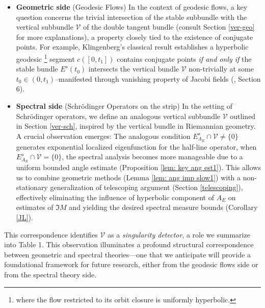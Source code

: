 \documentclass[11pt]{amsart}
\theoremstyle{remark}
\theoremstyle{definition}
\begin{document}
\begin{itemize}
\item {\textbf{Geometric side} (Geodesic Flows)} 
In the context of geodesic flows, a key question concerns the trivial intersection of the stable subbundle with the vertical subbundle $\mathcal{V}$ of the double tangent bundle (consult Section \ref{ver-geo} for more explanations), a property closely tied to the existence of conjugate points. For example, 
Klingenberg's classical result \cite{Kl74} establishes a hyperbolic geodesic 
\footnote{where the flow restricted to its orbit closure is uniformly hyperbolic.} segment $c([0,t_1])$ contains conjugate points \textit{if and only if} the stable bundle $E^s(t_0)$ intersects the vertical bundle $\mathcal{V}$ non-trivially at some $t_0 \in (0,t_1)$–manifested through vanishing property of Jacobi fields (\cite{Kl74}, Section 6).


\item{\textbf{Spectral side} (Schr\"odinger Operators on the strip)}
In the setting of Schr\"odinger operators, we define an analogous vertical subbundle $\mathcal{V}$ outlined in Section \ref{ver-sch}, inspired by the vertical bundle in Riemannian geometry. A crucial observation emerges: 
The analogous condition $E^s_{A_E} \cap \mathcal{V} \neq \{0\}$ generates exponential localized eigenfunction for the half-line operator, 
when $E^s_{A_E} \cap \mathcal{V} = \{0\}$,
the spectral analysis becomes more manageable due to a uniform bounded angle estimate (Proposition \ref{lem: key ang est1}). This allows us to combine geometric methods (Lemma  \ref{lem: ang imp slow1}) with a non-stationary generalization of telescoping argument (Section \ref{telescoping}), effectively eliminating the influence of hyperbolic component of $A_E$ on estimates of 
 $\Im M$ and yielding the desired spectral measure bounds (Corollary \ref{JL}). 
\end{itemize}


This correspondence identifies $\mathcal{V}$ as a \textit{singularity detector}, a role we summarize into Table 1. This observation illuminates a profound structural correspondence between geometric and spectral theories—one that we anticipate will provide a foundational framework for future research, either from the geodesic flows side or from the spectral theory side. 
\end{document}
